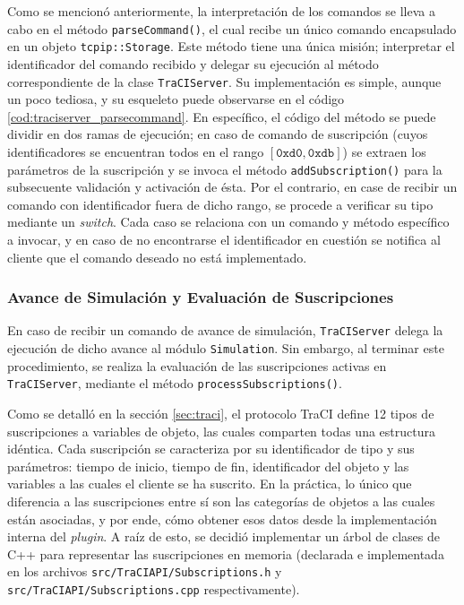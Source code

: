 

Como se mencionó anteriormente, la interpretación de los comandos se lleva a cabo en el método \texttt{parseCommand()}, el cual recibe un único comando encapsulado en un objeto \texttt{tcpip::Storage}. Este método tiene una única misión; interpretar el identificador del comando recibido y delegar su ejecución al método correspondiente de la clase \texttt{TraCIServer}. Su implementación es simple, aunque un poco tediosa, y su esqueleto puede observarse en el código \ref{cod:traciserver_parsecommand}. En específico, el código del método se puede dividir en dos ramas de ejecución; en caso de comando de suscripción (cuyos identificadores se encuentran todos en el rango $[\texttt{0xd0}, \texttt{0xdb}]$) se extraen los parámetros de la suscripción y se invoca el método \texttt{addSubscription()} para la subsecuente validación y activación de ésta. Por el contrario, en case de recibir un comando con identificador fuera de dicho rango, se procede a verificar su tipo mediante un \emph{switch}. Cada caso se relaciona con un comando y método específico a invocar, y en caso de no encontrarse el identificador en cuestión se notifica al cliente que el comando deseado no está implementado.



\subsubsection{Avance de Simulación y Evaluación de Suscripciones}

En caso de recibir un comando de avance de simulación, \texttt{TraCIServer} delega la ejecución de dicho avance al módulo \texttt{Simulation}. Sin embargo, al terminar este procedimiento, se realiza la evaluación de las suscripciones activas en \texttt{TraCIServer}, mediante el método \texttt{processSubscriptions()}.

Como se detalló en la sección \ref{sec:traci}, el protocolo TraCI define 12 tipos de suscripciones a variables de objeto, las cuales comparten todas una estructura idéntica. Cada suscripción se caracteriza por su identificador de tipo y sus parámetros: tiempo de inicio, tiempo de fin, identificador del objeto y las variables a las cuales el cliente se ha suscrito. En la práctica, lo único que diferencia a las suscripciones entre sí son las categorías de objetos a las cuales están asociadas, y por ende, cómo obtener esos datos desde la implementación interna del \emph{plugin}. A raíz de esto, se decidió implementar un árbol de clases de C++ para representar las suscripciones en memoria (declarada e implementada en los archivos \texttt{src/TraCIAPI/Subscriptions.h} y \texttt{src/TraCIAPI/Subscriptions.cpp} respectivamente).

